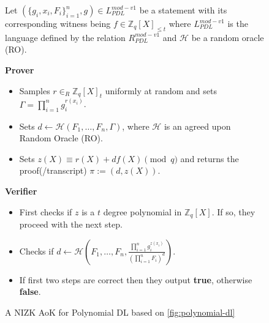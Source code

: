 \begin{figure}[ht]
    \centering
    \begin{tcolorbox}[title=$\pi_{PDL}^{mod-v1}$, width=0.9\textwidth, colframe=blue!75!black, colback=blue!10, sharp corners]
        Let $(\{g_i,x_i,F_i\}_{i=1}^n,g)\in L_{PDL}^{mod-v1}$ be a statement with its corresponding witness being $f\in\mathbb{Z}_q[X]_{\leq t}$ 
        where $L_{PDL}^{mod-v1}$ is the language defined by the relation $R_{PDL}^{mod-v1}$ and $\mathcal{H}$ be a 
        random oracle (RO).
        
        \vspace{0.5em}
        \textbf{Prover}
        \begin{itemize}
            \item Samples $r\in_{R}\mathbb{Z}_q[X]_{t}$ uniformly at random and sets 
              $\Gamma=\prod_{i=1}^{n}g_i^{r(x_i)}$.
            \item Sets $d\leftarrow \mathcal{H}(F_1,\dots,F_n,\Gamma)$, where $\mathcal{H}$ is 
                an agreed upon Random Oracle (RO).
            \item Sets $z(X)\equiv r(X)+df(X) \pmod{q}$ and returns the proof(/transcript) $\pi:= (d,z(X))$.
        \end{itemize}
        
        \vspace{0.5em}
        \textbf{Verifier}
        \begin{itemize}
            \item First checks if $z$ is a $t$ degree polynomial in $\mathbb{Z}_q[X]$. If so, they proceed with the next step.
            \item Checks if $d\leftarrow \mathcal{H}(F_1,\dots,F_n,\frac{\prod_{i=1}^{n}g_i^{z(x_i)}}{(\prod_{i=1}^{n}F_i)^d})$. 
            \item If first two steps are correct then they output \textbf{true}, otherwise \textbf{false}.
        \end{itemize}
    \end{tcolorbox}
    \caption{A NIZK AoK for Polynomial DL based on \ref{fig:polynomial-dl}}
    \label{fig:mod-v1-polynomial-dl}
\end{figure}

